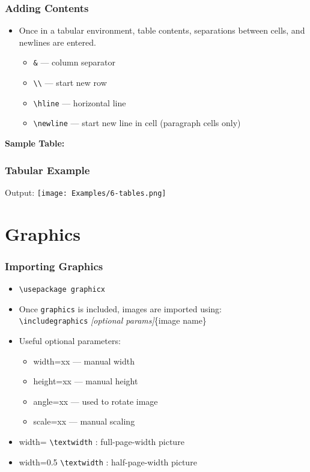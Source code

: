 \documentclass{beamer}
\newcommand{\pc}[1]
{
    \texttt{\textbackslash #1}
}
\begin{document}
\begin{frame} \frametitle{Adding Contents}
    \begin{itemize}
    	\item Once in a tabular environment, table contents, separations between cells, and newlines are entered.\\
    	\begin{itemize}
			\item \texttt{\&} --- column separator
			\item \texttt{\textbackslash\textbackslash} --- start new row
        	\item \pc{hline} --- horizontal line
			\item \pc{newline} --- start new line in cell (paragraph cells only)
		\end{itemize}
    \end{itemize}
    
    \textbf{Sample Table:}
    
\end{frame}

\begin{frame} \frametitle{Tabular Example}
    Output:
    \texttt{[image: Examples/6-tables.png]}
\end{frame}


\section{Graphics}
    \begin{frame}
    \frametitle{Importing Graphics}
    \begin{itemize}
        \item \texttt{\textbackslash usepackage graphicx}
        \item Once \texttt{graphics} is included, images are imported using:\\\vspace{6pt}\pc{includegraphics}\textit{[optional params]}\{image name\}\vspace{6pt}
        \item Useful optional parameters:
        \begin{itemize}
            \item width=xx --- manual width
            \item height=xx --- manual height
            \item angle=xx --- used to rotate image
            \item scale=xx --- manual scaling
        \end{itemize}
            
        \item width=\pc{textwidth}: full-page-width picture
        \item width=0.5\pc{textwidth}: half-page-width picture
    \end{itemize}
\end{frame}
\end{document}
